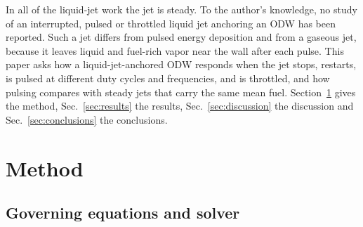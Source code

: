 \documentclass[aip,pof,preprint,amsmath,amssymb]{revtex4-2}
\begin{document}
In all of the liquid-jet work the jet is steady. To the author's knowledge, no study of an interrupted, pulsed or throttled liquid jet anchoring an ODW has been reported. Such a jet differs from pulsed energy deposition and from a gaseous jet, because it leaves liquid and fuel-rich vapor near the wall after each pulse. This paper asks how a liquid-jet-anchored ODW responds when the jet stops, restarts, is pulsed at different duty cycles and frequencies, and is throttled, and how pulsing compares with steady jets that carry the same mean fuel. Section~\ref{sec:method} gives the method, Sec.~\ref{sec:results} the results, Sec.~\ref{sec:discussion} the discussion and Sec.~\ref{sec:conclusions} the conclusions.

\section{Method}\label{sec:method}

\subsection{Governing equations and solver}
\end{document}
